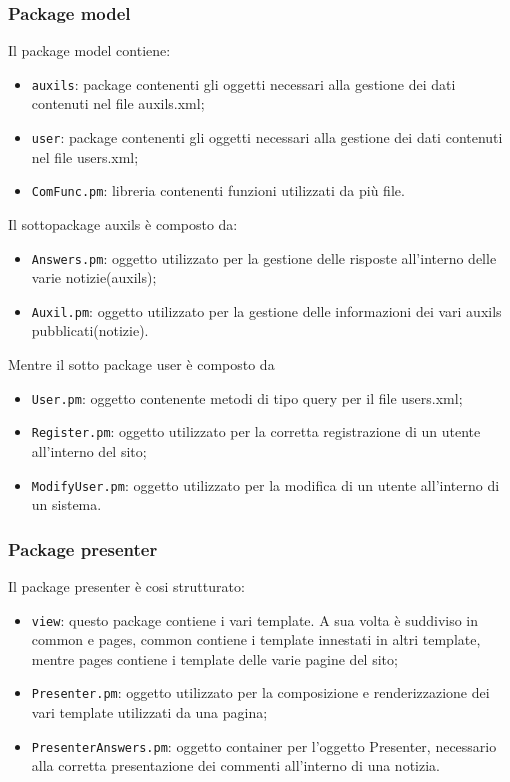 \subsubsection{Package model}
Il package model contiene:
\begin{itemize}
  \item \texttt{auxils}: package contenenti gli oggetti necessari alla gestione dei dati contenuti nel file auxils.xml;
  \item \texttt{user}: package contenenti gli oggetti necessari alla gestione dei dati contenuti nel file users.xml;
  \item \texttt{ComFunc.pm}: libreria contenenti funzioni utilizzati da più file.
\end{itemize}

Il sottopackage auxils è composto da:
\begin{itemize}
  \item \texttt{Answers.pm}: oggetto utilizzato per la gestione delle risposte all'interno delle varie notizie(auxils);
  \item \texttt{Auxil.pm}: oggetto utilizzato per la gestione delle informazioni dei vari auxils pubblicati(notizie).
\end{itemize}

Mentre il sotto package user è composto da 
\begin{itemize}
  \item \texttt{User.pm}: oggetto contenente metodi di tipo query per il file users.xml;
  \item \texttt{Register.pm}: oggetto utilizzato per la corretta registrazione di un utente all'interno del sito;
  \item \texttt{ModifyUser.pm}: oggetto utilizzato per la modifica di un utente all'interno di un sistema.
\end{itemize}

\subsubsection{Package presenter}
Il package presenter è cosi strutturato:
\begin{itemize}
  \item \texttt{view}: questo package contiene i vari template. A sua volta è suddiviso in common e pages, common contiene i template innestati in altri template, mentre pages contiene i template delle varie pagine del sito;
  \item \texttt{Presenter.pm}: oggetto utilizzato per la composizione e renderizzazione dei vari template utilizzati da una pagina;
  \item \texttt{PresenterAnswers.pm}: oggetto container per l'oggetto Presenter, necessario alla corretta presentazione dei commenti all'interno di una notizia.
\end{itemize}
